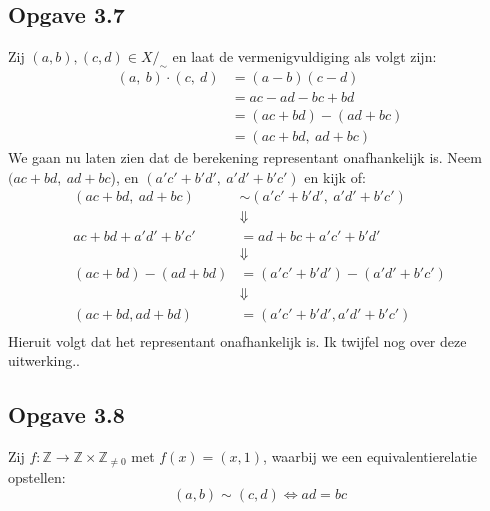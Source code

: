 \documentclass{article}
\newcommand{\Z}{\mathbb{Z}}
\newcommand{\q}{/_\sim}
\begin{document}
\subsection*{Opgave 3.7}
Zij $(a, b), (c, d) \in X\q$ en laat de vermenigvuldiging als volgt zijn:
\begin{align*}
	(a, \ b)\cdot(c, \ d) & = (a-b)(c-d)            \\
	                      & = ac - ad - bc + bd     \\
	                      & = (ac + bd) - (ad + bc) \\
	                      & = (ac + bd, \ ad + bc)
\end{align*}
We gaan nu laten zien dat de berekening representant onafhankelijk is.
Neem \((ac + bd, \ ad + bc\)), en \((a'c' + b'd', \ a'd'+b'c')\) en kijk of:
\begin{align*}
	(ac + bd, \ ad + bc)  & \sim (a'c' + b'd', \ a'd' + b'c') \\
	                      & \Downarrow                        \\
	ac + bd + a'd' + b'c' & = ad + bc + a'c' + b'd'           \\
	                      & \Downarrow                        \\
	(ac + bd) - (ad + bd) & = (a'c' + b'd') - (a'd' + b'c')   \\
	                      & \Downarrow                        \\
	(ac + bd, ad + bd)    & = (a'c' + b'd', a'd' + b'c')      \\
\end{align*}
Hieruit volgt dat het representant onafhankelijk is. Ik twijfel nog over deze uitwerking..

\subsection*{Opgave 3.8}
Zij $f: \Z \rightarrow \Z \times \Z_{\neq 0}$ met $f(x) = (x, 1)$, waarbij we een equivalentierelatie opstellen:
\[(a, b) \sim (c, d) \Longleftrightarrow ad = bc\]
\end{document}
